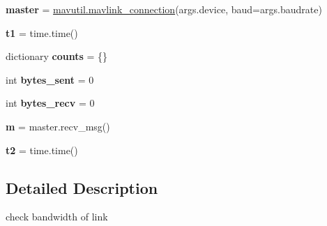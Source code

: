 \begin{DoxyCompactItemize}
{\bfseries master} = \hyperlink{namespacepymavlink_1_1mavutil_a021b0a1b1d488c0800662acaef819852}{mavutil.\+mavlink\+\_\+connection}(args.\+device, baud=args.\+baudrate)
\item 
\mbox{\label{namespacepymavlink_1_1examples_1_1bwtest_ad07e8a9178e3d4eddfb8db5f9525467f}} 
{\bfseries t1} = time.\+time()
\item 
\mbox{\label{namespacepymavlink_1_1examples_1_1bwtest_a8337b9d2eb5466652348f85a132fdec6}} 
dictionary {\bfseries counts} = \{\}
\item 
\mbox{\label{namespacepymavlink_1_1examples_1_1bwtest_a005de8de5862bdd85d1299177ee51f58}} 
int {\bfseries bytes\+\_\+sent} = 0
\item 
\mbox{\label{namespacepymavlink_1_1examples_1_1bwtest_ab55375291b155b2a2607fd48014a0d97}} 
int {\bfseries bytes\+\_\+recv} = 0
\item 
\mbox{\label{namespacepymavlink_1_1examples_1_1bwtest_a9e476130bb8cd37d293f893416517e55}} 
{\bfseries m} = master.\+recv\+\_\+msg()
\item 
\mbox{\label{namespacepymavlink_1_1examples_1_1bwtest_aedbe1ae71ec87c7d11ca85658f4b81de}} 
{\bfseries t2} = time.\+time()
\end{DoxyCompactItemize}


\subsection{Detailed Description}
\begin{DoxyVerb}check bandwidth of link
\end{DoxyVerb}
 